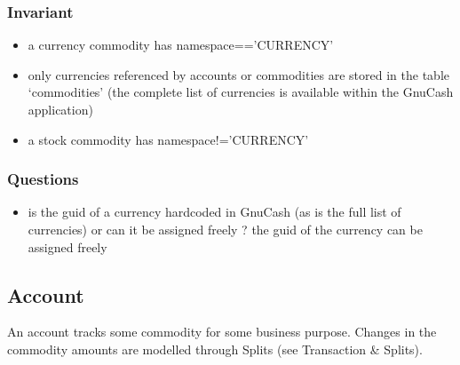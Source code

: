 \documentclass[letterpaper,10pt,english]{sphinxmanual}
\begin{document}
\subsubsection{Invariant}
\label{object_model:id2}\begin{itemize}
\item {} 
a currency commodity has namespace=='CURRENCY'

\item {} 
only currencies referenced by accounts or commodities are stored in the table `commodities' (the complete list of
currencies is available within the GnuCash application)

\item {} 
a stock commodity has namespace!='CURRENCY'

\end{itemize}


\subsubsection{Questions}
\label{object_model:id3}\begin{itemize}
\item {} 
is the guid of a currency hardcoded in GnuCash (as is the full list of currencies) or can it be assigned freely ?
the guid of the currency can be assigned freely

\end{itemize}


\subsection{Account}
\label{object_model:account}
An account tracks some commodity for some business purpose. Changes in the commodity amounts are modelled through Splits
(see Transaction \& Splits).
\end{document}
